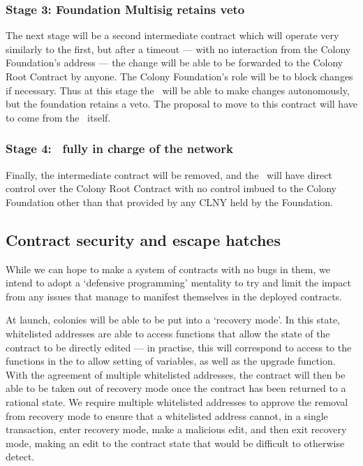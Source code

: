 \subsubsection*{Stage 3: Foundation Multisig retains veto}
The next stage will be a second intermediate contract which will operate very similarly to the first, but after a timeout --- with no interaction from the Colony Foundation's address --- the change will be able to be forwarded to the Colony Root Contract by anyone. The Colony Foundation's role will be to block changes if necessary. Thus at this stage the \rc\ will be able to make changes autonomously, but the foundation retains a veto.  The proposal to move to this contract will have to come from the \rc\ itself. 

\subsubsection*{Stage 4: \rc\ fully in charge of the network}
Finally, the intermediate contract will be removed, and the \rc\ will have direct control over the Colony Root Contract with no control imbued to the Colony Foundation other than that provided by any CLNY held by the Foundation. 

\subsection{Contract security and escape hatches}\label{sec:escape-hatches}
While we can hope to make a system of contracts with no bugs in them, we intend to adopt a `defensive programming' mentality to try and limit the impact from any issues that manage to manifest themselves in the deployed contracts.

At launch, colonies will be able to be put into a `recovery mode'. In this state, whitelisted addresses are able to access functions that allow the state of the contract to be directly edited --- in practise, this will correspond to access to the functions in the  to allow setting of variables, as well as the upgrade function. With the agreement of multiple whitelisted addresses, the contract will then be able to be taken out of recovery mode once the contract has been returned to a rational state. We require multiple whitelisted addresses to approve the removal from recovery mode to ensure that a whitelisted address cannot, in a single transaction, enter recovery mode, make a malicious edit, and then exit recovery mode, making an edit to the contract state that would be difficult to otherwise detect.

